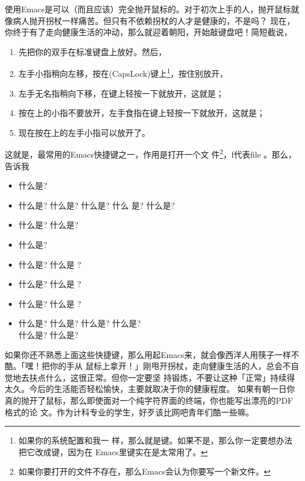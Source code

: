 使用Emacs是可以（而且应该）完全抛开鼠标的。对于初次上手的人，抛开鼠标就
像病人抛开拐杖一样痛苦。但只有不依赖拐杖的人才是健康的，不是吗？  现在，
你终于有了走向健康生活的冲动，那么就迎着朝阳，开始敲键盘吧！简短截说，
\begin{enumerate}
\item 先把你的双手在标准键盘上放好。然后，
\item 左手小指稍向左移，按在\LKeyCapsLock{}(CapsLock)键上\footnote{如果你的系统配置和我一
    样，那么\LKeyCapsLock{}就是\LKeyCtrl{}键。如果不是，那么你一定要想办法把它改成\LKeyCtrl{}键，因为在
    Emacs里\LKeyCtrl{}键实在是太常用了。}，按住别放开，
\item 左手无名指稍向下移，在键上轻按一下就放开，这就是；
\item 按在\LKeyCapsLock{}上的小指不要放开，左手食指在键上轻按一下就放开，这就是；
\item 现在按在\LKeyCapsLock{}上的左手小指可以放开了。
\end{enumerate}
这就是，最常用的Emacs快捷键之一，作用是打开一个文
件\footnote{如果你要打开的文件不存在，那么Emacs会认为你要写一个新文件。}，f代表file 。那么，
告诉我
\begin{itemize}
\item 什么是?
\item 什么是? 什么是? 什么是? 什么
  是? 什么是?
\item 什么是? 什么是?
\item 什么是?
\item 什么是? 什么是 ?
\item 什么是? 什么是 ?
\item 什么是? 什么是 ?
\item 什么是? 什么是? 什么是? 什么是? \\
  什么是? 什么是?
\end{itemize}

如果你还不熟悉上面这些快捷键，那么用起Emacs来，就会像西洋人用筷子一样不酷。「嘿！把你的手从
鼠标上拿开！」刚甩开拐杖，走向健康生活的人，总会不自觉地去扶点什么，这很正常。但你一定要坚
持锻炼，不要让这种「正常」持续得太久。今后的生活能否轻松愉快，主要就取决于你的健康程度。
如果有朝一日你真的抛开了鼠标，那么即使面对一个纯字符界面的终端，你也能写出漂亮的PDF格式的论
文。作为计科专业的学生，好歹该比网吧青年们酷一些嘛。

